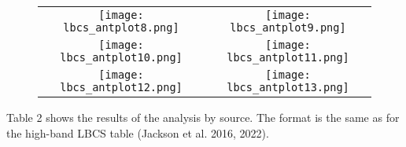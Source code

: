 \documentclass[12pt]{article}
\begin{document}
\begin{figure}
  \begin{tabular}{cc}
    \texttt{[image: lbcs\_antplot8.png]}&
    \texttt{[image: lbcs\_antplot9.png]}\\
    \texttt{[image: lbcs\_antplot10.png]}&
    \texttt{[image: lbcs\_antplot11.png]}\\
    \texttt{[image: lbcs\_antplot12.png]}&
    \texttt{[image: lbcs\_antplot13.png]}\\
  \end{tabular}
  \end{figure}
  
Table 2 shows the results of the analysis by source. The format is the same as for the high-band LBCS table (Jackson et al. 2016, 2022).

\clearpage
\scriptsize
\end{document}
